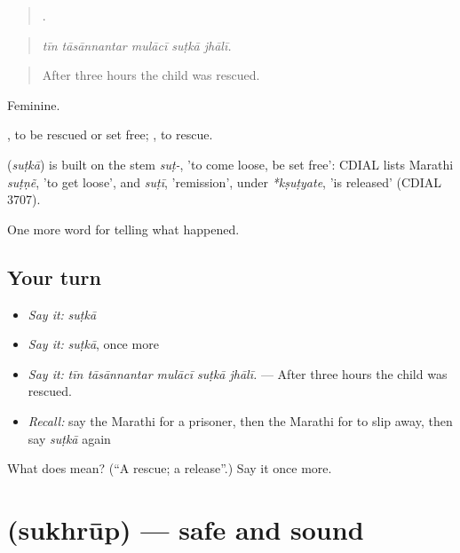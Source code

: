 \begin{quote}
    .
\end{quote}

\begin{quote}
\emph{tīn tāsānnantar mulācī suṭkā jhālī.}
\end{quote}

\begin{quote}
After three hours the child was rescued.
\end{quote}

Feminine.

 , to be rescued or set free;  , to rescue.

\begin{cousinweb}
\textbf{} (\emph{suṭkā}) is built on the stem \emph{suṭ-}, 'to come loose, be set free': CDIAL lists Marathi \emph{suṭṇẽ}, 'to get loose', and \emph{suṭī}, 'remission', under \emph{*kṣuṭyate}, 'is released' (CDIAL 3707).
\end{cousinweb}

\begin{grammarlens}[title={What you've built}]
One more word for telling what happened.
\end{grammarlens}

\subsection*{Your turn}
\begin{itemize}
\raggedright
  \item \emph{Say it:} \emph{suṭkā}
  \item \emph{Say it:} \emph{suṭkā}, once more
  \item \emph{Say it:} \emph{tīn tāsānnantar mulācī suṭkā jhālī.} — After three hours the child was rescued.
  \item \emph{Recall:} say the Marathi for a prisoner, then the Marathi for to slip away, then say \emph{suṭkā} again
\end{itemize}

\begin{tcolorbox}[breakable,colback=teal!4,colframe=teal!35!black,title={Before you move on}]
What does  mean? (\textquotedblleft{}A rescue; a release\textquotedblright{}.) Say it once more.
\end{tcolorbox}
\section[\texorpdfstring{\mr{सुखरूप} (sukhrūp)}{सुखरूप (sukhrūp)}]{ (sukhrūp) — safe and sound}

